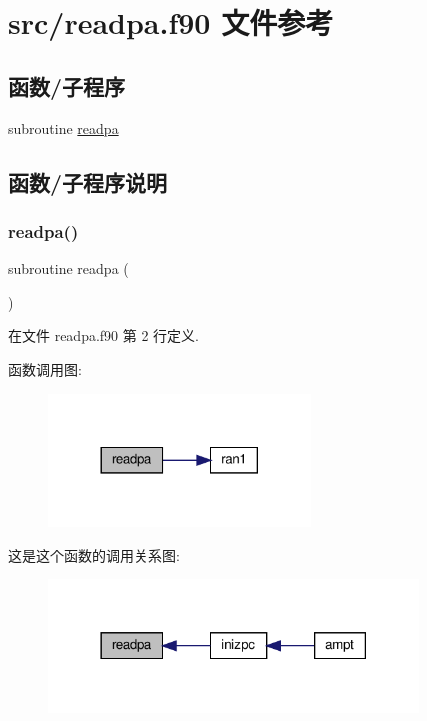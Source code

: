 \hypertarget{readpa_8f90}{}\section{src/readpa.f90 文件参考}
\label{readpa_8f90}
\subsection*{函数/子程序}
\begin{DoxyCompactItemize}
\item 
subroutine \mbox{\hyperlink{readpa_8f90_a8b0d061a17e5733dc2862339898521df}{readpa}}
\end{DoxyCompactItemize}


\subsection{函数/子程序说明}
\mbox{\label{readpa_8f90_a8b0d061a17e5733dc2862339898521df}} 
\subsubsection{\texorpdfstring{readpa()}{readpa()}}
{\footnotesize\ttfamily subroutine readpa (\begin{DoxyParamCaption}{ }\end{DoxyParamCaption})}



在文件 readpa.\+f90 第 2 行定义.

函数调用图\+:
\nopagebreak
\begin{figure}[H]
\begin{center}
\leavevmode
\includegraphics[width=197pt]{readpa_8f90_a8b0d061a17e5733dc2862339898521df_cgraph}
\end{center}
\end{figure}
这是这个函数的调用关系图\+:
\nopagebreak
\begin{figure}[H]
\begin{center}
\leavevmode
\includegraphics[width=278pt]{readpa_8f90_a8b0d061a17e5733dc2862339898521df_icgraph}
\end{center}
\end{figure}
